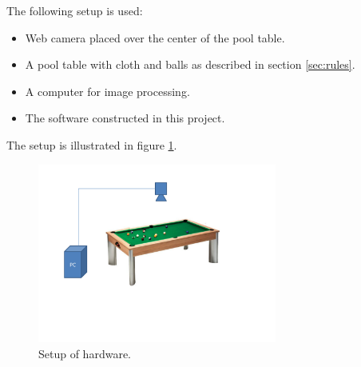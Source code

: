 The following setup is used:
\begin{itemize}
	\item Web camera placed over the center of the pool table.
	\item A pool table with cloth and balls as described in section \ref{sec:rules}.
	\item A computer for image processing.
	\item The software constructed in this project.
\end{itemize}

The setup is illustrated in figure \ref{fig:setup}.

\begin{figure}[htpb]
\begin{center}
\leavevmode
\includegraphics[width=0.7\textwidth]{images/setup}
\end{center}
\caption{Setup of hardware.}
\label{fig:setup}
\end{figure}